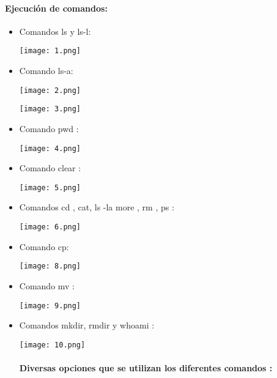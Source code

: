 \documentclass[12pt]{article}
\begin{document}
\paragraph{ Ejecución de comandos: }
\begin{itemize}
    \item Comandos ls y ls-l:
    
    \texttt{[image: 1.png]}
    
    \item Comando ls-a:
    
    \texttt{[image: 2.png]}
    
    \texttt{[image: 3.png]}
    
    \item Comando  pwd :
    
    \texttt{[image: 4.png]}
    \newpage
    \item Comando clear :
    
    \texttt{[image: 5.png]}
    
    \item Comandos cd , cat, ls -la more , rm , ps  :
    
    \texttt{[image: 6.png]}
    
    \newpage
    
    \item Comando cp:
    
    \texttt{[image: 8.png]}

    \item Comando  mv :
    
    \texttt{[image: 9.png]}
    
    \newpage
 
    \item Comandos mkdir, rmdir y whoami :
    
    \texttt{[image: 10.png]}

\paragraph{ Diversas opciones que se utilizan los diferentes comandos : }


\end{itemize}
\end{document}
